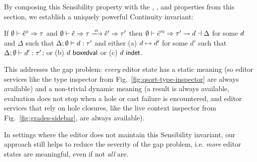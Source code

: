 By composing this Sensibility property with
the , ,  and  properties from this section, we establish a
uniquely powerful Continuity invariant:
\begin{corol}[Continuity]
  \label{thrm:actsafe} 
  If $\emptyset \vdash \hat{e}^{\diamond} \Rightarrow \tau$ and
    $\performSyn{\emptyset}{\zexp}{\htau}{\alpha}{\zexp'}{\tau'}$ then
    $\emptyset \vdash \hat{e}'^{\diamond} \Rightarrow \tau' \leadsto d \dashv \Delta$
      for some $d$ and $\Delta$ such that 
$\Delta; \emptyset \vdash d : \tau'$
and either
  (a) $d \mapsto d'$ for some $d'$ such that $\Delta; \emptyset \vdash d' : \tau'$; or
  (b) $d~\mathsf{boxedval}$ or
  (c) $d~\mathsf{indet}$.
\end{corol}

This addresses the gap problem: \emph{every} editor state has a {static
meaning} (so editor services like the type inspector from Fig.~\ref{fig:qsort-type-inspector} are always available) and a non-trivial {dynamic meaning} (a result is always available, evaluation does not stop when a hole or cast failure is encountered, and editor services that rely on hole closures, like the live context inspector from Fig.~\ref{fig:grades-sidebar}, are always available).

In settings where the editor does not maintain this Sensibility invariant, our approach still helps to reduce the severity of the gap problem, i.e. \emph{more} editor states are meaningful, even if not \emph{all} are.%
%


